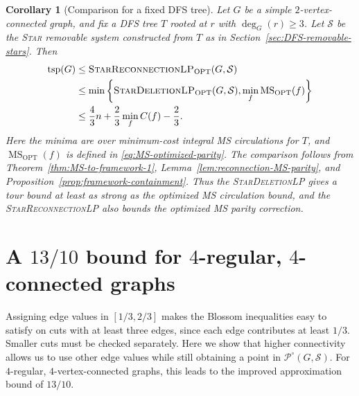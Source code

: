 \documentclass[11pt]{amsart}
\newcommand{\1}{\mathbbm{1}}
\newcommand{\MSopt}{\operatorname{MS}_{\mathrm{OPT}}}
\newcommand{\LPone}{\textsc{StarDeletionLP}}
\newcommand{\LPtwo}{\textsc{StarReconnectionLP}}
\newtheorem{corollary}[theorem]{Corollary}
\begin{document}
\begin{corollary}[Comparison for a fixed DFS tree]
\label{thm:framework-1-dominates-MS}
Let $G$ be a simple $2$-vertex-connected graph, and fix a
DFS tree $T$ rooted at $r$ with $\deg_G(r)\ge3$.
Let $\mathcal S$ be the \textsc{Star} removable system
constructed from $T$ as in Section~\ref{sec:DFS-removable-stars}.
Then
\[
 \begin{aligned}
 \operatorname{tsp}(G)
 &\le\text{\LPtwo}_{\mathrm{OPT}}(G,\mathcal S)\\
 &\le\min\left\{\text{\LPone}_{\mathrm{OPT}}(G,\mathcal S),
                 \min_f\MSopt(f)\right\}\\
 &\le\frac43n+{\frac23}\min_f C(f)-\frac23.
 \end{aligned}
\]
Here the minima are over minimum-cost integral MS circulations for
$T$, and $\MSopt(f)$ is defined in
\eqref{eq:MS-optimized-parity}. The comparison follows from
Theorem~\ref{thm:MS-to-framework-1},
Lemma~\ref{lem:reconnection-MS-parity}, and
Proposition~\ref{prop:framework-containment}.
Thus the \LPone{} gives a tour bound at least as strong as the
optimized MS circulation bound, and the \LPtwo{} also bounds
the optimized MS parity correction.
\end{corollary}











\clearpage












\section{A \texorpdfstring{$13/10$}{13/10} bound for \texorpdfstring{$4$}{4}-regular, \texorpdfstring{$4$}{4}-connected graphs}
\label{sec:quartic-framework-2}
Assigning edge values in $[1/3,2/3]$ makes the Blossom
inequalities easy to satisfy on cuts with at least three
edges, since each edge contributes at least $1/3$.
Smaller cuts must be checked separately.
Here we show that higher connectivity allows us to use
other edge values while still obtaining a point in
${\mathcal P^\circ}(G,\mathcal S)$.
For $4$-regular, $4$-vertex-connected graphs, this leads
to the improved approximation bound of $13/10$.
\end{document}
